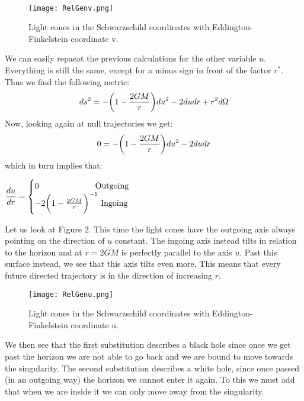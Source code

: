 \documentclass[]{article}
\theoremstyle{definition}
\theoremstyle{Theorem}
\theoremstyle{definition}
\theoremstyle{definition}
\theoremstyle{definition}
\begin{document}
\\
\begin{center}
	\begin{figure}[h!]
		\centering
		\texttt{[image: RelGenv.png]}
		\caption{Light cones in the Schwarzschild coordinates with Eddington-Finkelstein coordinate v.}
	\end{figure}
\end{center}
We can easily repaeat the previous calculations for the other variable $u$. Everything is still the same, except for a minus sign in front of the factor $r^*$. Thus we find the following metric:
$$ds^2=-\bigg(1-{2GM\over r}\bigg)du^2-2dudr+r^2d\Omega$$
Now, looking again at null trajectories we get:
$$0=-\bigg(1-{2GM\over r}\bigg)du^2-2dudr$$
which in turn implies that:
\begin{center}
	\begin{math}
		\displaystyle {du\over dr}=
		\begin{cases}
			0 \mbox{\hspace{68pt}Outgoing}\\
			-2\bigg(1-{2GM\over r}\bigg)^{-1} \mbox{  Ingoing}
		\end{cases}
	\end{math}
\end{center}
Let us look at Figure 2. This time the light cones have the outgoing axis always pointing on the direction of $u$ constant. The ingoing axis instead tilts in relation to the horizon and at $r=2GM$ is perfectly parallel to the axis $u$. Past this surface instead, we see that this axis tilts even more. This means that every future directed trajectory is in the direction of increasing $r$.
\begin{center}
	\begin{figure}[h!]
		\centering
		\texttt{[image: RelGenu.png]}
		\caption{Light cones in the Schwarzschild coordinates with Eddington-Finkelstein coordinate u.}
	\end{figure}
\end{center}
We then see that the first substitution describes a black hole since once we get past the horizon we are not able to go back and we are bound to move towards the singularity. The second substitution describes a white hole, since once passed (in an outgoing way) the horizon we cannot enter it again. To this we must add that when we are inside it we can only move away from the singularity.\\
\\
\end{document}
